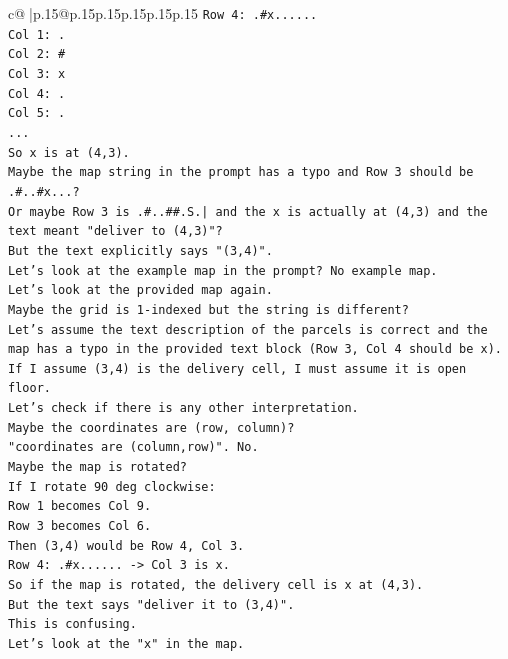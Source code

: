 \documentclass{article}
\begin{document}
{\begin{supertabular}{c@{$\;$}|p{.15\linewidth}@{}p{.15\linewidth}p{.15\linewidth}p{.15\linewidth}p{.15\linewidth}p{.15\linewidth}}
{{{\texttt{Row 4: .\#x......} \\
\texttt{Col 1: .} \\
\texttt{Col 2: \#} \\
\texttt{Col 3: x} \\
\texttt{Col 4: .} \\
\texttt{Col 5: .} \\
\texttt{...} \\
\texttt{So x is at (4,3).} \\
\texttt{Maybe the map string in the prompt has a typo and Row 3 should be .\#..\#x...?} \\
\texttt{Or maybe Row 3 is .\#..\#\#.S.| and the x is actually at (4,3) and the text meant "deliver to (4,3)"?} \\
\texttt{But the text explicitly says "(3,4)".} \\
\texttt{Let's look at the example map in the prompt? No example map.} \\
\texttt{Let's look at the provided map again.} \\
\texttt{Maybe the grid is 1{-}indexed but the string is different?} \\
\texttt{Let's assume the text description of the parcels is correct and the map has a typo in the provided text block (Row 3, Col 4 should be x).} \\
\texttt{If I assume (3,4) is the delivery cell, I must assume it is open floor.} \\
\texttt{Let's check if there is any other interpretation.} \\
\texttt{Maybe the coordinates are (row, column)?} \\
\texttt{"coordinates are (column,row)". No.} \\
\texttt{Maybe the map is rotated?} \\
\texttt{If I rotate 90 deg clockwise:} \\
\texttt{Row 1 becomes Col 9.} \\
\texttt{Row 3 becomes Col 6.} \\
\texttt{Then (3,4) would be Row 4, Col 3.} \\
\texttt{Row 4: .\#x...... {-}> Col 3 is x.} \\
\texttt{So if the map is rotated, the delivery cell is x at (4,3).} \\
\texttt{But the text says "deliver it to (3,4)".} \\
\texttt{This is confusing.} \\
\texttt{Let's look at the "x" in the map.} \\
}}}
\end{supertabular}}
\end{document}

